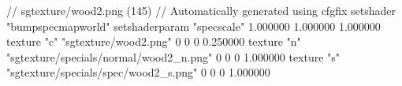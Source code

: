 // sgtexture/wood2.png (145)
// Automatically generated using cfgfix
setshader "bumpspecmapworld"
setshaderparam "specscale" 1.000000 1.000000 1.000000
texture "c" "sgtexture/wood2.png" 0 0 0 0.250000
texture "n" "sgtexture/specials/normal/wood2_n.png" 0 0 0 1.000000
texture "s" "sgtexture/specials/spec/wood2_s.png" 0 0 0 1.000000
